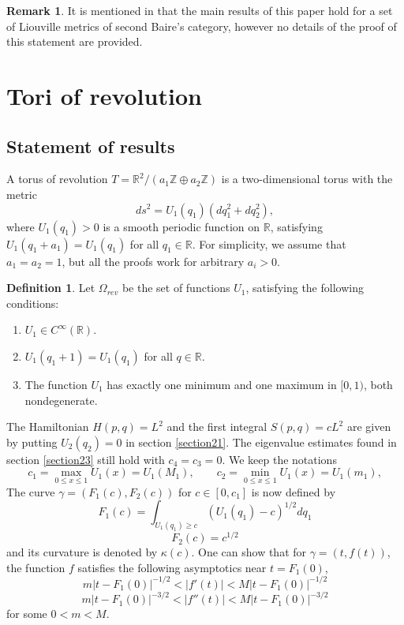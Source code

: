 \documentclass[12pt]{amsart}
\numberwithin{equation}{subsection}
\theoremstyle{definition}
\newtheorem{definition}[equation]{Definition}
\newtheorem{remark}[equation]{Remark}
\theoremstyle{plain}
\begin{document}
\begin{remark}
It is mentioned in \cite{1} that the main results of this paper hold for a set of Liouville metrics of  second Baire's category, however no details of the proof of this statement are provided.
\end{remark}

\section{Tori of revolution}
\label{section4}
\subsection{Statement of results}
A torus of revolution $T= \mathbb R^2 / (a_1 \mathbb Z \oplus a_2 \mathbb Z)$ is a two-dimensional torus with the metric
\begin{equation}
ds^2 = U_1(q_1)(dq_1^2 + dq_2^2),
\end{equation}
where $U_1(q_1) > 0$ is a smooth periodic function on $\mathbb R$, satisfying $U_1(q_1+a_1) = U_1(q_1)$ for all $q_1 \in \mathbb R$.
For simplicity, we assume that $a_1=a_2=1$, but all the proofs work for arbitrary $a_i>0$.

\begin{definition}
\label{condition114}
Let $\Omega_{rev}$ be the set of functions $U_1$, satisfying the following conditions:
\begin{enumerate}
\item $U_1 \in C^{\infty}(\mathbb{R})$.
\item $U_1(q_1 + 1) = U_1(q_1)$ for all $q \in \mathbb R$.
\item The function $U_1$ has exactly one minimum and one maximum in $[0,1)$, both nondegenerate.
\end{enumerate}
\end{definition}

The Hamiltonian $H(p,q) = L^2$ and the first integral $S(p,q) = cL^2$ are given by putting $U_2(q_2)=0$ in section \ref{section21}.
The eigenvalue estimates found in section \ref{section23} still hold with $c_4=c_3=0$.
We keep the notations
\[
c_1 = \max_{0 \leq x \leq 1} U_1(x) = U_1(M_1), \qquad c_2 = \min_{0 \leq x \leq 1} U_1(x) = U_1(m_1),
\]
The curve $\gamma = (F_1(c),F_2(c))$ for $c \in [0,c_1]$ is now defined by
\[
F_1(c)=
 \int_{U_1(q_1) \geq c} (U_1(q_1) - c)^{1/2} dq_1
\]
\[
F_2(c)= c^{1/2}
\]
and its curvature is denoted by $\kappa(c)$.
One can show that for $\gamma=(t,f(t))$, the function $f$ satisfies the following asymptotics near $t=F_1(0)$,
\[
m |t-F_1(0)|^{-1/2} < |f'(t)| < M |t-F_1(0)|^{-1/2}
\]
\[
m |t-F_1(0)|^{-3/2} < |f''(t)| < M |t-F_1(0)|^{-3/2}
\]
for some $0<m<M$.
\end{document}
